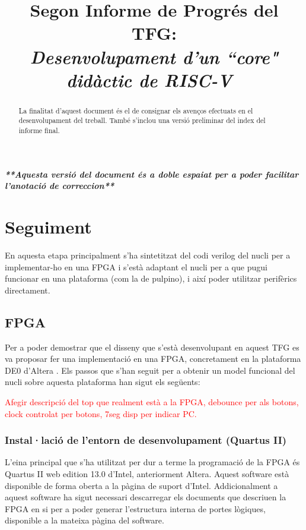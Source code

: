 \documentclass[conference,onecolumn, catalan]{IEEEtran}
\title{Segon Informe de Progrés del TFG: \\ \vspace{0.2cm} {\huge \textit{ Desenvolupament d'un ``core" didàctic de RISC-V\ }} }
\author{
\IEEEauthorblockN{Pau Casacuberta Orta}
\IEEEauthorblockA{
\textit{Autonomous University of Barcelona}\\
Cerdanyola del Vallès, Barcelona 08193\\
pau.casacubertao@e-campus.uab.cat\\}}
\newcommand\todo[1]{\textcolor{red}{#1}}
\begin{document}
\maketitle

\textbf{\textit{**Aquesta versió del document és a doble espaiat per a poder facilitar l'anotació de correccion**}}
\begin{versionhistory}
\end{versionhistory}


\begin{abstract}
La finalitat d'aquest document és el de consignar els avenços efectuats en el desenvolupament del treball. També s'inclou una versió preliminar del index del informe final.
\end{abstract}



\section{Seguiment}

En aquesta etapa principalment s'ha sintetitzat del codi verilog del nucli per a implementar-ho en una FPGA i s'està adaptant el nucli per a que pugui funcionar en una plataforma (com la de pulpino), i així poder utilitzar perifèrics directament.


\subsection{FPGA}

Per a poder demostrar que el disseny que s'està desenvolupant en aquest TFG es va proposar fer una implementació en una FPGA, concretament en la plataforma DE0 d'Altera \cite{technologies_terasic_nodate}. Els passos que s'han seguit per a obtenir un model funcional del nucli sobre aquesta plataforma han sigut els següents:

\todo{Afegir descripció del top que realment està a la FPGA, debounce per als botons, clock controlat per botons, 7seg disp per indicar PC.}

\subsubsection{Instal·lació de l'entorn de desenvolupament (Quartus II)}

L'eina principal que s'ha utilitzat per dur a terme la programació de la FPGA és Quartus II web edition 13.0 \cite{jose_quartus_2013} d'Intel, anteriorment Altera. Aquest software està disponible de forma oberta a la pàgina de suport d'Intel. Addicionalment a aquest software ha sigut necessari descarregar els documents que descriuen la FPGA en si per a poder generar l'estructura interna de portes lògiques, disponible a la mateixa pàgina del software.
\end{document}
